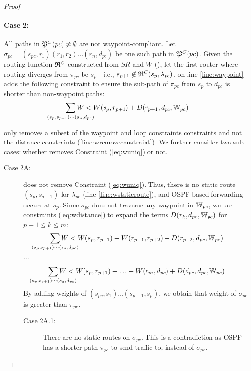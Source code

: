 \begin{proof}
	\paragraph{Case 2:} All paths in $\mathfrak{P}^C(pc)
	\not=\emptyset$ are not waypoint-compliant. 
	Let $\sigma_{pc} = (s_{pc}, r_1)(r_1, r_2) \ldots
	(r_n, d_{pc})$ be one such path in $\mathfrak{P}^C(pc)$.
	Given the routing function $\mathfrak{R}^C$ constructed from $SR$ and
	$W$ (), let the first router where routing diverges from $\pi_{pc}$ be $s_p$---i.e.,  
	$s_{p+1} \not\in \mathfrak{R}^C(s_{p}, \lambda_{pc})$. 
	 on line \ref{line:waypoint} adds the following
	constraint to ensure the sub-path of $\pi_{pc}$ 
	from $s_{p}$ to $d_{pc}$ is shorter than non-waypoint paths:
	\begin{equation} \label{eq:wuniq}
	\sum_{\mathclap{\substack{(s_{p}, s_{p+1})\cdots(s_n, d_{pc})}}} 
	W < W(s_{p}, r_{p+1})+ D(r_{p+1}, d_{pc}, \waypt_{pc})
	\end{equation}

	only removes a subset of the waypoint and loop constraints
	constraints and 
	not the distance constraints (\ref{line:wremoveconstraint}). We further consider 
	two sub-cases: whether 
	removes Constraint (\ref{eq:wuniq}) or not. 

\begin{description}
	\item[Case 2A:]
	 does not remove Constraint (\ref{eq:wuniq}). 
	Thus, there is no static route $(s_p, s_{p+1})$ for
	$\lambda_{pc}$ (line \ref{line:wstaticroute}), and 
	OSPF-based forwarding occurs at $s_{p}$. 
	Since $\sigma_{pc}$ does not traverse any 
	waypoint in $\mathbb{W}_{pc}$,
	we use constraints (\ref{eq:wdistance}) 
	to expand the terms $D(r_k, d_{pc}, \mathbb{W}_{pc})$ for $p+1 \leq k \leq m$:
	\[
	\sum_{\mathclap{\substack{(s_{p}, s_{p+1})\cdots(s_n, d_{pc})}}} 
	W < W(s_{p}, r_{p+1})+ W(r_{p+1}, r_{p+2}) + D(r_{p+2}, d_{pc},\waypt_{pc})
	\] 
	\begin{center}
		$\ldots$
	\end{center}
	\[
	\sum_{\mathclap{\substack{(s_{p}, s_{p+1})\cdots(s_n, d_{pc})}}} 
	W < W(s_{p}, r_{p+1})+ \ldots + W(r_{m}, d_{pc}) + D(d_{pc}, d_{pc}, \waypt_{pc})
	\]
	By adding weights of $(s_{pc}, s_1)\ldots(s_{p-1}, s_p)$, we obtain that weight of $\sigma_{pc}$ 
	is greater than $\pi_{pc}$. 
	\begin{description}
			\item[Case 2A.1:]
			There are no static routes on $\sigma_{pc}$. This is a contradiction
			as OSPF has a shorter path $\pi_{pc}$ to send traffic to, instead of $\sigma_{pc}$.
			

\end{description}
\end{description}
\end{proof}
